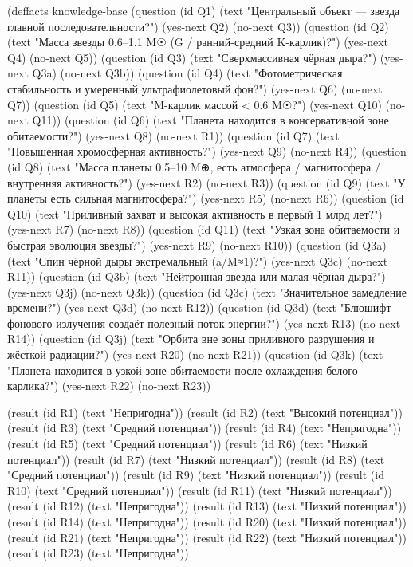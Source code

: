 \documentclass[14pt,a4paper]{extarticle}
\begin{document}
\begin{Code}
(deffacts knowledge-base
  (question
    (id Q1)
    (text "Центральный объект — звезда главной последовательности?")
    (yes-next Q2)
    (no-next Q3))
  (question
    (id Q2)
    (text "Масса звезды 0.6–1.1 M☉ (G / ранний-средний K-карлик)?")
    (yes-next Q4)
    (no-next Q5))
  (question
    (id Q3)
    (text "Сверхмассивная чёрная дыра?")
    (yes-next Q3a)
    (no-next Q3b))
  (question
    (id Q4)
    (text "Фотометрическая стабильность и умеренный ультрафиолетовый фон?")
    (yes-next Q6)
    (no-next Q7))
  (question
    (id Q5)
    (text "M-карлик массой < 0.6 M☉?")
    (yes-next Q10)
    (no-next Q11))
  (question
    (id Q6)
    (text "Планета находится в консервативной зоне обитаемости?")
    (yes-next Q8)
    (no-next R1))
  (question
    (id Q7)
    (text "Повышенная хромосферная активность?")
    (yes-next Q9)
    (no-next R4))
  (question
    (id Q8)
    (text "Масса планеты 0.5–10 M⊕, есть атмосфера / магнитосфера / внутренняя активность?")
    (yes-next R2)
    (no-next R3))
  (question
    (id Q9)
    (text "У планеты есть сильная магнитосфера?")
    (yes-next R5)
    (no-next R6))
  (question
    (id Q10)
    (text "Приливный захват и высокая активность в первый 1 млрд лет?")
    (yes-next R7)
    (no-next R8))
  (question
    (id Q11)
    (text "Узкая зона обитаемости и быстрая эволюция звезды?")
    (yes-next R9)
    (no-next R10))
  (question
    (id Q3a)
    (text "Спин чёрной дыры экстремальный (a/M≈1)?")
    (yes-next Q3c)
    (no-next R11))
  (question
    (id Q3b)
    (text "Нейтронная звезда или малая чёрная дыра?")
    (yes-next Q3j)
    (no-next Q3k))
  (question
    (id Q3c)
    (text "Значительное замедление времени?")
    (yes-next Q3d)
    (no-next R12))
  (question
    (id Q3d)
    (text "Блюшифт фонового излучения создаёт полезный поток энергии?")
    (yes-next R13)
    (no-next R14))
  (question
    (id Q3j)
    (text "Орбита вне зоны приливного разрушения и жёсткой радиации?")
    (yes-next R20)
    (no-next R21))
  (question
    (id Q3k)
    (text "Планета находится в узкой зоне обитаемости после охлаждения белого карлика?")
    (yes-next R22)
    (no-next R23))

  (result (id R1) (text "Непригодна"))
  (result (id R2) (text "Высокий потенциал"))
  (result (id R3) (text "Средний потенциал"))
  (result (id R4) (text "Непригодна"))
  (result (id R5) (text "Средний потенциал"))
  (result (id R6) (text "Низкий потенциал"))
  (result (id R7) (text "Низкий потенциал"))
  (result (id R8) (text "Средний потенциал"))
  (result (id R9) (text "Низкий потенциал"))
  (result (id R10) (text "Средний потенциал"))
  (result (id R11) (text "Низкий потенциал"))
  (result (id R12) (text "Непригодна"))
  (result (id R13) (text "Низкий потенциал"))
  (result (id R14) (text "Непригодна"))
  (result (id R20) (text "Низкий потенциал"))
  (result (id R21) (text "Непригодна"))
  (result (id R22) (text "Низкий потенциал"))
  (result (id R23) (text "Непригодна"))


\end{Code}
\end{document}
